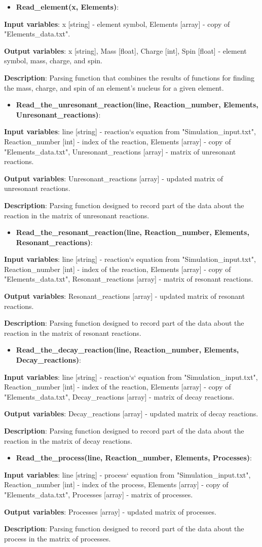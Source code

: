 \documentclass[a4paper,12pt]{article}
\newcommand{\namefunction}[4]{
  \begin{itemize}
    \item \textbf{#1}:
  \end{itemize}
  
  \textbf{Input variables}: #2.
  
  \textbf{Output variables}: #4.
  
  \textbf{Description}: #3.
}
\begin{document}
\vspace{1em}

\namefunction{Read\_element(x, Elements)}{x [string] - element symbol, Elements [array] - copy of "Elements\_data.txt"}{Parsing function that combines the results of functions for finding the mass, charge, and spin of an element's nucleus for a given element}{x [string], Mass [float], Charge [int], Spin [float] - element symbol, mass, charge, and spin}

\vspace{1em}

\namefunction{Read\_the\_unresonant\_reaction(line, Reaction\_number, Elements, Unresonant\_reactions)}{line [string] - reaction`s equation from "Simulation\_input.txt", Reaction\_number [int] - index of the reaction, Elements [array] - copy of "Elements\_data.txt", Unresonant\_reactions [array] - matrix of unresonant reactions}{Parsing function designed to record part of the data about the reaction in the matrix of unresonant reactions}{Unresonant\_reactions [array] - updated matrix of unresonant reactions}

\vspace{1em}

\namefunction{Read\_the\_resonant\_reaction(line, Reaction\_number, Elements, Resonant\_reactions)}{line [string] - reaction`s equation from "Simulation\_input.txt", Reaction\_number [int] - index of the reaction, Elements [array] - copy of "Elements\_data.txt", Resonant\_reactions [array] - matrix of resonant reactions}{Parsing function designed to record part of the data about the reaction in the matrix of resonant reactions}{Resonant\_reactions [array] - updated matrix of resonant reactions}

\vspace{1em}

\namefunction{Read\_the\_decay\_reaction(line, Reaction\_number, Elements, Decay\_reactions)}{line [string] - reaction`s` equation from "Simulation\_input.txt", Reaction\_number [int] - index of the reaction, Elements [array] - copy of "Elements\_data.txt", Decay\_reactions [array] - matrix of decay reactions}{Parsing function designed to record part of the data about the reaction in the matrix of decay reactions}{Decay\_reactions [array] - updated matrix of decay reactions}

\vspace{1em}

\namefunction{Read\_the\_process(line, Reaction\_number, Elements, Processes)}{line [string] - process` equation from "Simulation\_input.txt", Reaction\_number [int] - index of the process, Elements [array] - copy of "Elements\_data.txt", Processes [array] - matrix of processes}{Parsing function designed to record part of the data about the process in the matrix of processes}{Processes [array] - updated matrix of processes}
\end{document}
